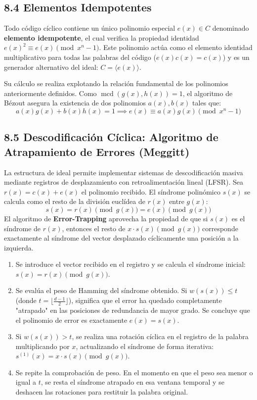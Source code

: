 \documentclass{article}
\begin{document}
\subsection{8.4 Elementos Idempotentes}

Todo código cíclico contiene un único polinomio especial $e(x) \in C$ denominado \textbf{elemento idempotente}, el cual verifica la propiedad identidad $e(x)^2 \equiv e(x) \pmod{x^n-1}$. Este polinomio actúa como el elemento identidad multiplicativo para todas las palabras del código ($e(x)c(x) = c(x)$) y es un generador alternativo del ideal: $C = \langle e(x) \rangle$.

Su cálculo se realiza explotando la relación fundamental de los polinomios anteriormente definidos. Como $\operatorname{mcd}(g(x), h(x)) = 1$, el algoritmo de Bézout asegura la existencia de dos polinomios $a(x), b(x)$ tales que:
\[
a(x)g(x) + b(x)h(x) = 1 \implies e(x) \equiv a(x)g(x) \pmod{x^n-1}
\]

\subsection{8.5 Descodificación Cíclica: Algoritmo de Atrapamiento de Errores (Meggitt)}

La estructura de ideal permite implementar sistemas de descodificación masiva mediante registros de desplazamiento con retroalimentación lineal (LFSR). Sea $r(x) = c(x) + e(x)$ el polinomio recibido. El síndrome polinómico $s(x)$ se calcula como el resto de la división euclídea de $r(x)$ entre $g(x)$:
\[
s(x) = r(x) \pmod{g(x)} = e(x) \pmod{g(x)}
\]
El algoritmo de \textbf{Error-Trapping} aprovecha la propiedad de que si $s(x)$ es el síndrome de $r(x)$, entonces el resto de $x \cdot s(x) \pmod{g(x)}$ corresponde exactamente al síndrome del vector desplazado cíclicamente una posición a la izquierda.

\begin{enumerate}
    \item Se introduce el vector recibido en el registro y se calcula el síndrome inicial: $s(x) = r(x) \pmod{g(x)}$.
    \item Se evalúa el peso de Hamming del síndrome obtenido. Si $w(s(x)) \le t$ (donde $t = \lfloor \frac{d-1}{2} \rfloor$), significa que el error ha quedado completamente "atrapado" en las posiciones de redundancia de mayor grado. Se concluye que el polinomio de error es exactamente $e(x) = s(x)$.
    \item Si $w(s(x)) > t$, se realiza una rotación cíclica en el registro de la palabra multiplicando por $x$, actualizando el síndrome de forma iterativa: $s^{(1)}(x) = x \cdot s(x) \pmod{g(x)}$.
    \item Se repite la comprobación de peso. En el momento en que el peso sea menor o igual a $t$, se resta el síndrome atrapado en esa ventana temporal y se deshacen las rotaciones para restituir la palabra original.
\end{enumerate}
\end{document}

